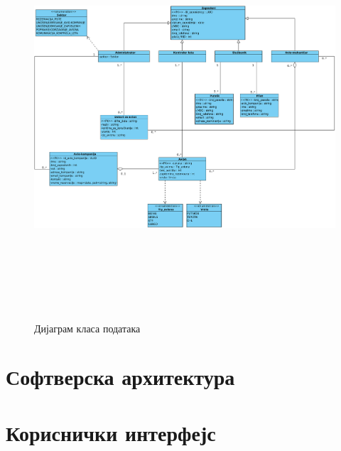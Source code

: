 \documentclass{article}
\begin{document}
\begin{figure}[H]
    \begin{center}
        \includegraphics[width=1.1\textwidth, height=15cm]{Dijagrami_slike/dijagram_klasa_podataka.jpg}
        \caption{Дијаграм класа података}
    \end{center}
\end{figure}

\section{Софтверска архитектура}

\section{Кориснички интерфејс}

\newpage

 
\end{document}
